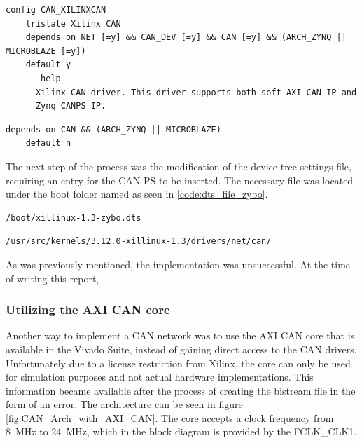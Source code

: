 \begin{lstlisting}[firstnumber=128,caption={Kconfig file contents from line 128.},label=code:can_kconfig_contents128]
config CAN_XILINXCAN
	tristate Xilinx CAN
	depends on NET [=y] && CAN_DEV [=y] && CAN [=y] && (ARCH_ZYNQ || MICROBLAZE [=y])
	default y
	---help---
	  Xilinx CAN driver. This driver supports both soft AXI CAN IP and
	  Zynq CANPS IP.
\end{lstlisting}

\begin{lstlisting}[firstnumber=130,caption={Original content of lines 130 and 131.},label=code:can_kconfig_original_line130]
	depends on CAN && (ARCH_ZYNQ || MICROBLAZE)
	default n
\end{lstlisting}

The next step of the process was the modification of the device tree settings file, requiring an entry for the CAN PS to be inserted. The necessary file was located under the boot folder named as seen in \ref{code:dts_file_zybo}.

\begin{lstlisting}[numbers=none,caption={Device tree settings file and its path.},label=code:dts_file_zybo]
/boot/xillinux-1.3-zybo.dts
\end{lstlisting}

\begin{lstlisting}[caption={CAN Kconfig pathfile.},numbers=none,label=code:can_kconfig_pathfile]
/usr/src/kernels/3.12.0-xillinux-1.3/drivers/net/can/
\end{lstlisting}
As was previously mentioned, the implementation was unsuccessful. At the time of writing this report, 

\subsubsection{Utilizing the AXI CAN core}

Another way to implement a CAN network was to use the AXI CAN core that is available in the Vivado Suite, instead of gaining direct access to the CAN drivers.
Unfortunately due to a license restriction from Xilinx, the core can only be used for simulation purposes and not actual hardware implementations.
This information became available after the process of creating the bistream file in the form of an error. The architecture can be seen in figure \ref{fig:CAN_Arch_with_AXI_CAN}.
The core accepts a clock frequency from \SI{8}{\mega\hertz} to \SI{24}{\mega\hertz}, which in the block diagram is provided by the FCLK\_CLK1.

